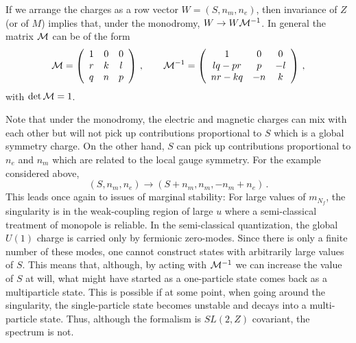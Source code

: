 If we arrange the charges as a row vector $W = (S, n_m, n_e)$, then
invariance of $Z$ (or of $M$) implies that, under the monodromy,
$W \rightarrow W{\cal M}^{-1}$. In general the matrix ${\cal M}$ can
be of the form
$$
{\cal M} = \left ( \begin{array}{ccc}
1 & 0 & 0 \\ r & k & l \\ q & n & p
\end{array} \right )\,,
\qquad
{\cal M}^{-1} = \left ( \begin{array}{ccc}
1 & 0 & 0 \\ lq-pr & p & -l \\
nr-kq & -n & k
\end{array} \right )\,,
$$
with $\det {\cal M} = 1$. 

Note that under the monodromy, the electric and magnetic charges can
mix with each other but will not pick up contributions proportional to
$S$ which is a global symmetry charge.  On the other hand, $S$ can
pick up contributions proportional to $n_e$ and $n_m$ which are
related to the local gauge symmetry.  For the example considered
above,
$$
(S, n_m, n_e ) \rightarrow (S + n_m, n_m, -n_m + n_e )\,.
$$
This leads once again to issues of marginal stability: For large
values of $m_{N_f}$, the singularity is in the weak-coupling region of
large $u$ where a semi-classical treatment of monopole is reliable.
In the semi-classical quantization, the global $U(1)$ charge is
carried only by fermionic zero-modes. Since there is only a finite
number of these modes, one cannot construct states with arbitrarily
large values of $S$. This means that, although, by acting with ${\cal
M}^{-1}$ we can increase the value of $S$ at will, what might have
started as a one-particle state comes back as a multiparticle state.  
This is possible if at some point, when going around the singularity,
the single-particle state becomes unstable and decays into a
multi-particle state. Thus, although the formalism is $SL(2, Z)$
covariant, the spectrum is not. 

